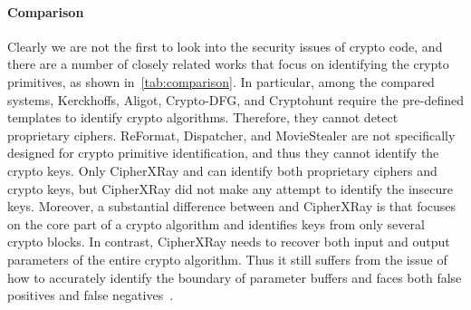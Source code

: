 \paragraph{Comparison} Clearly we are not the first to look into the security issues of crypto code, and there are a number of closely related works that focus on identifying the crypto primitives, as shown in~\autoref{tab:comparison}. %
In particular, among the compared systems, \textsf{\small Kerckhoffs}, \textsf{\small Aligot}, \textsf{\small Crypto-DFG}, and \textsf{\small Cryptohunt} require the pre-defined templates to identify crypto algorithms. Therefore, they cannot detect proprietary ciphers. \textsf{\small ReFormat}, \textsf{\small Dispatcher}, and \textsf{\small MovieStealer} are not specifically designed for crypto primitive identification, and thus they cannot identify the crypto keys. Only \textsf{\small CipherXRay} and \sysname can identify both proprietary ciphers and crypto keys, but \textsf{\small CipherXRay} did not make any attempt to identify the insecure keys.
{Moreover, a substantial difference between \sysname and \textsf{\small CipherXRay} is that \sysname focuses on the core part of a crypto algorithm and identifies keys from only several crypto blocks.
In contrast, \textsf{\small CipherXRay} needs to recover both input and output parameters of the entire crypto algorithm.
Thus it still suffers from the issue of how to accurately identify the boundary of parameter buffers and faces both false positives and false negatives~\cite{lestringant2017thesis}.
}

